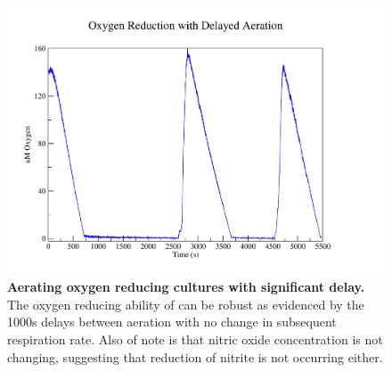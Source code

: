 \begin{figure}[p]
 \centering
 \includegraphics[width=14cm, trim=75px 50px 125px 25px]{./05-oxygenreduction/data/o2_delay.pdf}
 \caption[Aerating oxygen reducing cultures with significant delay]{{\bf Aerating oxygen reducing cultures with significant delay.} The oxygen reducing ability of \Nm{} can be robust as evidenced by the 1000s delays between aeration with no change in subsequent respiration rate. Also of note is that nitric oxide concentration is not changing, suggesting that reduction of nitrite is not occurring either.
 \label{fig:repeat_oxy_with_delay}}
\end{figure}
\afterpage{\clearpage}

